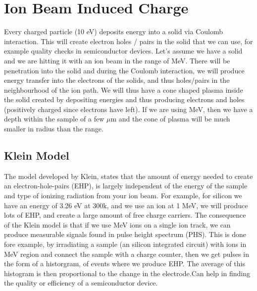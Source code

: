 \section{Ion Beam Induced Charge}
Every charged particle (10 eV) deposits energy into a solid via Coulomb interaction.
This will create electron holes / pairs in the solid that we can use, for example quality checks in semiconductor devices.
Let's assume we have a solid and we are hitting it with an ion beam in the range of MeV.
There will be penetration into the solid and during the Coulomb interaction, we will produce energy transfer into the electrons of the solids, and thus holes/pairs in the neighbourhood of the ion path.
We will thus have a cone shaped plasma inside the solid created by depositing energies and thus producing electrons and holes (positively charged since electrons have left).
If we are using MeV, then we have a depth within the sample of a few $\mu$m and the cone of plasma will be much smaller in radius than the range.
\subsection{Klein Model}
The model developed by Klein, states that the amount of energy needed to create an electron-hole-pairs (EHP), is largely independent of the energy of the sample and type of ionizing radiation from your ion beam.
For example, for silicon we have an energy of 3.26 eV at 300k, and we use an ion at 1 MeV, we will produce lots of EHP, and create a large amount of free charge carriers.
The consequence of the Klein model is that if we use MeV ions on a single ion track, we can produce measurable signals found in pulse height spectrum (PHS).
This is done fore example, by irradiating a sample (an silicon integrated circuit) with ions in MeV region and connect the sample with a charge counter, then we get pulses in the form of a historgram, of events where we produce EHP.
The average of this histogram is then proportional to the change in the electrode.Can help in finding the quality or efficiency of a semiconductor device.

